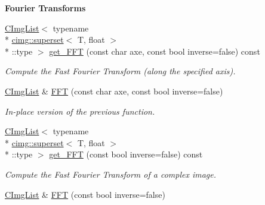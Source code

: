 \begin{Indent}{\bf Fourier Transforms}\par
\begin{DoxyCompactItemize}
\item 
\hypertarget{structcimg__library_1_1_c_img_list_a87666008a3b87272fecdd777ee3e3fa0}{\hyperlink{structcimg__library_1_1_c_img_list}{C\-Img\-List}$<$ typename \\*
\hyperlink{structcimg__library_1_1cimg_1_1superset}{cimg\-::superset}$<$ T, float $>$\\*
\-::type $>$ \hyperlink{structcimg__library_1_1_c_img_list_a87666008a3b87272fecdd777ee3e3fa0}{get\-\_\-\-F\-F\-T} (const char axe, const bool inverse=false) const }\label{structcimg__library_1_1_c_img_list_a87666008a3b87272fecdd777ee3e3fa0}

\begin{DoxyCompactList}\small\item\em Compute the Fast Fourier Transform (along the specified axis). \end{DoxyCompactList}\item 
\hypertarget{structcimg__library_1_1_c_img_list_ab8d59c92e8f81e85a36c9270921af652}{\hyperlink{structcimg__library_1_1_c_img_list}{C\-Img\-List} \& \hyperlink{structcimg__library_1_1_c_img_list_ab8d59c92e8f81e85a36c9270921af652}{F\-F\-T} (const char axe, const bool inverse=false)}\label{structcimg__library_1_1_c_img_list_ab8d59c92e8f81e85a36c9270921af652}

\begin{DoxyCompactList}\small\item\em In-\/place version of the previous function. \end{DoxyCompactList}\item 
\hypertarget{structcimg__library_1_1_c_img_list_aaf3db5f7bd5cbfe94fdf50c552085f72}{\hyperlink{structcimg__library_1_1_c_img_list}{C\-Img\-List}$<$ typename \\*
\hyperlink{structcimg__library_1_1cimg_1_1superset}{cimg\-::superset}$<$ T, float $>$\\*
\-::type $>$ \hyperlink{structcimg__library_1_1_c_img_list_aaf3db5f7bd5cbfe94fdf50c552085f72}{get\-\_\-\-F\-F\-T} (const bool inverse=false) const }\label{structcimg__library_1_1_c_img_list_aaf3db5f7bd5cbfe94fdf50c552085f72}

\begin{DoxyCompactList}\small\item\em Compute the Fast Fourier Transform of a complex image. \end{DoxyCompactList}\item 
\hypertarget{structcimg__library_1_1_c_img_list_ad5c1d2707b9c37993003b0ff6a3ab752}{\hyperlink{structcimg__library_1_1_c_img_list}{C\-Img\-List} \& \hyperlink{structcimg__library_1_1_c_img_list_ad5c1d2707b9c37993003b0ff6a3ab752}{F\-F\-T} (const bool inverse=false)}\label{structcimg__library_1_1_c_img_list_ad5c1d2707b9c37993003b0ff6a3ab752}


\end{DoxyCompactItemize}
\end{Indent}
